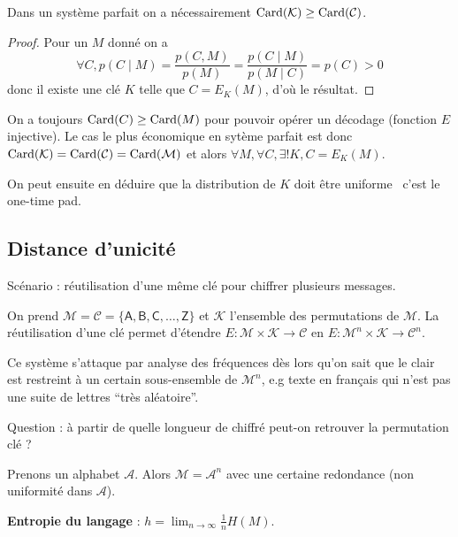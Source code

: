 	\begin{thm}
		Dans un système parfait on a nécessairement $\operatorname{Card}(\mathcal{K}) \geq \operatorname{Card}(\mathcal{C})$.
	\end{thm}
	
	\begin{proof}
		Pour un $M$ donné on a
		$$\forall C, p(C \mid M) = \frac{p(C,M)}{p(M)} = \frac{p(C \mid M)}{p(M \mid C)} = p(C) > 0$$
		donc il existe une clé $K$ telle que $C = E_K(M)$, d'où le résultat.
	\end{proof}
	
	\begin{rem}
		On a toujours $\operatorname{Card}(C) \geq \operatorname{Card}(M)$ pour pouvoir opérer un décodage (fonction $E$ injective).
		Le cas le plus économique en sytème parfait est donc $\operatorname{Card}(\mathcal{K}) = \operatorname{Card}(\mathcal{C}) = \operatorname{Card}(\mathcal{M})$ et alors $\forall M, \forall C, \exists ! K, C = E_K(M)$.
	\end{rem}
	
	On peut ensuite en déduire que la distribution de $K$ doit être uniforme \textrightarrow\ c'est le one-time pad.


\subsection{Distance d'unicité}

	Scénario : réutilisation d'une même clé pour chiffrer plusieurs messages.
	
	\begin{ex}
		On prend $\mathcal{M} = \mathcal{C} = \{ \mathsf{A},\mathsf{B},\mathsf{C},\ldots,\mathsf{Z} \}$ et $\mathcal{K}$ l'ensemble des permutations de $\mathcal{M}$.
		La réutilisation d'une clé permet d'étendre $E \colon \mathcal{M} \times \mathcal{K} \to \mathcal{C}$ en $E \colon \mathcal{M}^n \times \mathcal{K} \to \mathcal{C}^n$.
		
		Ce système s'attaque par analyse des fréquences dès lors qu'on sait que le clair est restreint à un certain sous-ensemble de $\mathcal{M}^n$, e.g texte en français qui n'est pas une suite de lettres “très aléatoire”.
	\end{ex}
	
	Question : à partir de quelle longueur de chiffré peut-on retrouver la permutation clé ?
	
	Prenons un alphabet $\mathcal{A}$.
	Alors $\mathcal{M} = \mathcal{A}^n$ avec une certaine redondance (non uniformité dans $\mathcal{A}$).
	
	\begin{defn}
		\textbf{Entropie du langage} : $h = \lim_{n \to \infty} \frac{1}{n} H(M)$.
	\end{defn}
	
